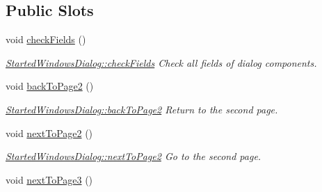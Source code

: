 \subsection*{Public Slots}
\begin{DoxyCompactItemize}
\item 
\hypertarget{classGui_1_1Dialogs_1_1StartedWindowsDialog_a9ea73c16c7917ff50c596cd1942dabfa}{}void \hyperlink{classGui_1_1Dialogs_1_1StartedWindowsDialog_a9ea73c16c7917ff50c596cd1942dabfa}{check\+Fields} ()\label{classGui_1_1Dialogs_1_1StartedWindowsDialog_a9ea73c16c7917ff50c596cd1942dabfa}

\begin{DoxyCompactList}\small\item\em \hyperlink{classGui_1_1Dialogs_1_1StartedWindowsDialog_a9ea73c16c7917ff50c596cd1942dabfa}{Started\+Windows\+Dialog\+::check\+Fields} Check all fields of dialog components. \end{DoxyCompactList}\item 
\hypertarget{classGui_1_1Dialogs_1_1StartedWindowsDialog_a690559be1b50a5ae7afc0ab64d0a28b8}{}void \hyperlink{classGui_1_1Dialogs_1_1StartedWindowsDialog_a690559be1b50a5ae7afc0ab64d0a28b8}{back\+To\+Page2} ()\label{classGui_1_1Dialogs_1_1StartedWindowsDialog_a690559be1b50a5ae7afc0ab64d0a28b8}

\begin{DoxyCompactList}\small\item\em \hyperlink{classGui_1_1Dialogs_1_1StartedWindowsDialog_a690559be1b50a5ae7afc0ab64d0a28b8}{Started\+Windows\+Dialog\+::back\+To\+Page2} Return to the second page. \end{DoxyCompactList}\item 
\hypertarget{classGui_1_1Dialogs_1_1StartedWindowsDialog_afd791a73e2d897147b31c829131942af}{}void \hyperlink{classGui_1_1Dialogs_1_1StartedWindowsDialog_afd791a73e2d897147b31c829131942af}{next\+To\+Page2} ()\label{classGui_1_1Dialogs_1_1StartedWindowsDialog_afd791a73e2d897147b31c829131942af}

\begin{DoxyCompactList}\small\item\em \hyperlink{classGui_1_1Dialogs_1_1StartedWindowsDialog_afd791a73e2d897147b31c829131942af}{Started\+Windows\+Dialog\+::next\+To\+Page2} Go to the second page. \end{DoxyCompactList}\item 
\hypertarget{classGui_1_1Dialogs_1_1StartedWindowsDialog_abac16c4f9fc0a3481565530fa01d8494}{}void \hyperlink{classGui_1_1Dialogs_1_1StartedWindowsDialog_abac16c4f9fc0a3481565530fa01d8494}{next\+To\+Page3} ()\label{classGui_1_1Dialogs_1_1StartedWindowsDialog_abac16c4f9fc0a3481565530fa01d8494}


\end{DoxyCompactItemize}

